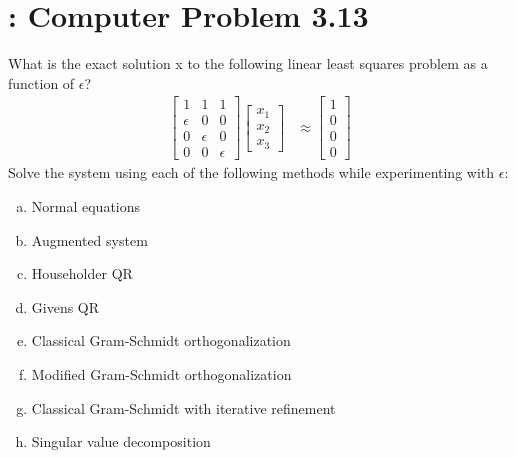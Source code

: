 \documentclass[paper=a4, fontsize=11pt]{scrartcl}
\numberwithin{equation}{section}		%
\numberwithin{figure}{section}			%
\numberwithin{table}{section}				%
\begin{document}
\section{: Computer Problem 3.13}
What is the exact solution x to the following linear least squares problem as a function of $\epsilon$?
\begin{align*}
	\begin{bmatrix}
		1 & 1 & 1 \\ \epsilon & 0 & 0 \\ 0 & \epsilon & 0 \\ 0 & 0 & \epsilon
	\end{bmatrix}
	\begin{bmatrix}
		x_1 \\ x_2 \\ x_3
	\end{bmatrix}
	&\approx
	\begin{bmatrix}
		1 \\ 0 \\ 0 \\ 0
	\end{bmatrix}
\end{align*}
Solve the system using each of the following methods while experimenting with $\epsilon$:
\begin{enumerate}[(a)]
	\item Normal equations \vspace{-2mm}
	\item Augmented system \vspace{-2mm}
	\item Householder QR \vspace{-2mm}
	\item Givens QR \vspace{-2mm}
	\item Classical Gram-Schmidt orthogonalization \vspace{-2mm}
	\item Modified Gram-Schmidt orthogonalization \vspace{-2mm}
	\item Classical Gram-Schmidt with iterative refinement \vspace{-2mm}
	\item Singular value decomposition \vspace{-2mm}
\end{enumerate}

\vspace{4mm}
\end{document}
